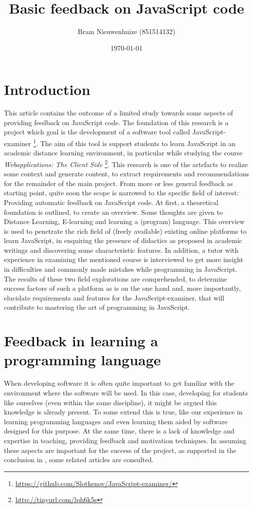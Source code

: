 \documentclass{article}
\begin{document}
 

\title{Basic feedback on JavaScript code} \author{Bram Nieuwenhuize (851514132)} 
\date{\today} \maketitle 

\section{Introduction} This article contains the outcome of a limited study 
towards 
some aspects of providing feedback on JavaScript code. The foundation of this 
research is a project which goal is the development of a software tool called 
JavaScript-examiner
\footnote{\url{https://github.com/Slotkenov/JavaScript-examiner/}}.
The aim of this tool is support students to learn 
JavaScript in an academic distance learning environment, in particular
while studying the course {\em Webapplications: The Client Side}
\footnote{\url{http://tinyurl.com/lph6k5s}}. This research is one of 
the artefacts to realize some context and generate content, to extract 
requirements and recommendations for the remainder of the main project. \newline 
From more or less general feedback as starting point, quite soon the scope is 
narrowed to the specific field of interest: Providing automatic feedback on 
JavaScript code. At first, a theoretical foundation is outlined, to create an 
overview. Some thoughts are given to Distance Learning, E-learning and 
learning a (program) language.
This overview is used to penetrate the rich field of (freely 
available) existing online platforms to learn JavaScript, in enquiring the
presence of didactics as proposed in academic writings and discovering some 
characteristic features. In addition, a tutor with experience in examining
the mentioned course is 
interviewed to get more insight in difficulties and commonly made mistakes while 
programming in JavaScript. The results of these two field explorations are 
comprehended, to determine success factors of such a platform as is on the one 
hand and, more importantly, elucidate requirements and features for the 
JavaScript-examiner, that will contribute to mastering the art of programming in 
JavaScript. 

\section{Feedback in learning a programming language}
When developing software it is often quite important to get familiar with the 
environment where the software will be used. In this case, developing for
students like ourselves (even within the same discipline), it might be argued
this knowledge is already present. To some extend this is true, like our
experience in learning programming languages and even learning them aided by 
software designed for this purpose. At the same time, there is a lack of
knowledge and expertise in teaching, providing feedback and 
motivation techniques. In assuming these aspects are important for the success
of the project, as supported in the conclusion in
\citep{al2009investigating}
 , some related articles are consulted.
\end{document}
